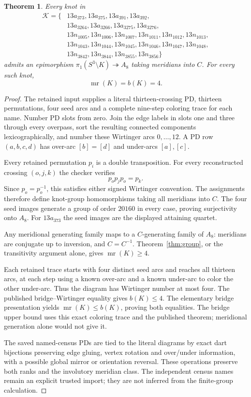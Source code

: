 \documentclass[11pt]{article}
\newtheorem{theorem}{Theorem}
\newcommand{\mr}{\operatorname{mr}}
\begin{document}
\begin{theorem}\label{thm:sharp}
Every knot in
\[
\begin{aligned}
\mathcal K=\{&13a_{373},13a_{375},13a_{391},13a_{392},\\
&13a_{3264},13a_{3266},13a_{3275},13a_{3276},\\
&13n_{1005},13n_{1006},13n_{1007},13n_{1011},13n_{1012},13n_{1013},\\
&13n_{1043},13n_{1044},13n_{1045},13n_{1046},13n_{1047},13n_{1048},\\
&13n_{3842},13n_{3844},13n_{3855},13n_{3856}\}
\end{aligned}
\]
admits an epimorphism $\pi_1(S^3\setminus K)\twoheadrightarrow A_8$
taking meridians into $C$. For every such knot,
\[
                         \mr(K)=b(K)=4.
\]
\end{theorem}
\begin{proof}
The retained input supplies a literal thirteen-crossing PD, thirteen
permutations, four seed arcs and a complete nine-step coloring trace
for each name. Number PD slots from zero. Join the edge labels in
slots one and three through every overpass, sort the resulting
connected components lexicographically, and number these Wirtinger
arcs $0,\ldots,12$. A PD row $(a,b,c,d)$ has over-arc $[b]=[d]$
and under-arcs $[a],[c]$.

Every retained permutation $p_i$ is a double transposition.
For every reconstructed crossing $(o,j,k)$ the checker verifies
\[
                          p_op_jp_o=p_k.
\]
Since $p_o=p_o^{-1}$, this satisfies either signed Wirtinger convention.
The assignments therefore define knot-group homomorphisms taking all
meridians into $C$. The four seed images generate a group of order
$20160$ in every case, proving surjectivity onto $A_8$.
For $13a_{373}$ the seed images are the displayed attaining quartet.

Any meridional generating family maps to a $C$-generating family of
$A_8$: meridians are conjugate up to inversion, and $C=C^{-1}$.
Theorem~\ref{thm:group}, or the transitivity argument alone, gives
$\mr(K)\ge4$.

Each retained trace starts with four distinct seed arcs and reaches
all thirteen arcs, at each step using a known over-arc and a known
under-arc to color the other under-arc. Thus the diagram has Wirtinger
number at most four. The published bridge--Wirtinger equality
\cite[Definition~1.2 and Theorem~1.3]{bkvv} gives $b(K)\le4$.
The elementary bridge presentation yields $\mr(K)\le b(K)$, proving
both equalities. The bridge upper bound uses this exact coloring
trace and the published theorem; meridional generation alone would
not give it.

The saved named-census PDs are tied to the literal diagrams by exact
dart bijections preserving edge gluing, vertex rotation and over/under
information, with a possible global mirror or orientation reversal.
These operations preserve both ranks and the involutory meridian
class. The independent census names remain an explicit trusted import;
they are not inferred from the finite-group calculation.
\end{proof}
\end{document}
